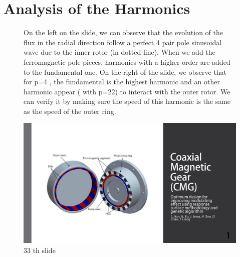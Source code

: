 \section{Analysis of the Harmonics}
\begin{figure}[H]
    \begin{minipage}{.45\linewidth}
    On the left on the slide, we can observe that the evolution of the flux in the radial direction follow a perfect 4 pair pole sinusoidal wave due to the inner rotor (in dotted line). When we add the ferromagnetic pole pieces, harmonics with a higher order are added to the fundamental one.
    On the right of the slide, we observe that for p=4 , the fundamental is the highest harmonic and an other harmonic appear ( with p=22) to interact with the outer rotor. We can verify it by making sure the speed of this harmonic is the same as the speed of the outer ring.
       
    \end{minipage}
    \hfill%
    \begin{minipage}[c]{.45\linewidth}
        \centering
        \includegraphics[page={33},width=\textwidth]{LELEC2311.allow.pdf}
        \caption{33 th slide}
        \label{fig:33_th slide}
    \end{minipage}
\end{figure}

